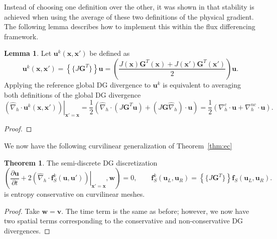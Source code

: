 \documentclass[preprint,10pt]{article}
\theoremstyle{definition}
\theoremstyle{lemma}
\newtheorem{lemma}{Lemma}
\theoremstyle{theorem}
\newtheorem{theorem}{Theorem}
\theoremstyle{assumption}
\renewcommand{\hat}{\widehat}
\newcommand{\pd}[2]{\frac{\partial#1}{\partial#2}}
\newcommand{\LRp}[1]{\left( #1 \right)}
\newcommand{\LRa}[1]{\left\langle #1 \right\rangle}
\newcommand{\LRc}[1]{\left\{ #1 \right\}}
\newcommand{\LRl}[1]{\left. \LRp{#1} \right|}
\newcommand{\avg}[1] {\ensuremath{\LRc{\!\{#1\}\!}}}
\newcommand{\Grad} {\ensuremath{\nabla}}
\newcommand{\note}[1]{{\color{blue}{#1}}}
\begin{document}
Instead of choosing one definition over the other, it was shown in \cite{wintermeyer2017entropy} that stability is achieved when using the average of these two definitions of the physical gradient.  The following lemma describes how to implement this within the flux differencing framework.
\begin{lemma}
Let $\bm{u}^k(\bm{x},\bm{x}')$ be defined as
\[
\bm{u}^k(\bm{x},\bm{x}') = \avg{J\bm{G}^T}\bm{u} = \LRp{\frac{J(\bm{x})\bm{G}^T(\bm{x}) + J(\bm{x}')\bm{G}^T(\bm{x}')}{2}}\bm{u}.
\]
Applying the reference global DG divergence to $\bm{u}^k$ is equivalent to averaging both definitions of the global DG divergence
\[
\LRl{{\hat{\Grad}_h \cdot \bm{u}^k(\bm{x},\bm{x}')}}_{\bm{x}'=\bm{x}} = \frac{1}{2}\LRp{\hat{\Grad}_h\cdot\LRp{J\bm{G}^T\bm{u}} + \LRp{J\bm{G}\hat{\Grad}_h}\cdot\bm{u}} = \frac{1}{2}\LRp{\Grad^c_h\cdot \bm{u} + \Grad_h^{nc}\cdot\bm{u}}.
\]
\end{lemma}
\begin{proof}
\note{TBD.}
\end{proof}

We now have the following curvilinear generalization of Theorem~\ref{thm:ec}
\begin{theorem}
\label{thm:ec_curvi}
The semi-discrete DG discretization 
\[
\LRp{\pd{\bm{u}}{t} + 2\LRl{\hat{\Grad}_h\cdot \bm{f}^k_S(\bm{u},\bm{u}')}_{\bm{x}'=\bm{x}},\bm{w}} = 0, \qquad \bm{f}^k_S(\bm{u}_L,\bm{u}_R) = \avg{J\bm{G}^T}\bm{f}_S(\bm{u}_L,\bm{u}_R).
\]
is entropy conservative on curvilinear meshes.  
\end{theorem}
\begin{proof}
Take $\bm{w} = \bm{v}$.  The time term is the same as before; however, we now have two spatial terms corresponding to the conservative and non-conservative DG divergences.  
\note{Essentially, integrating the conservative divergence terms by parts results in volume contributions with the non-conservative divergence, and vice-versa.  Contributions are swapped between each type of divergence, so that the last steps of the affine entropy conservation proof can be repeated for two volume terms (involving the conservative and non-conservative divergence, respectively).}

\end{proof}
\end{document}
